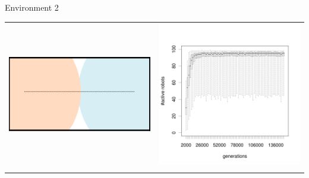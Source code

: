 \documentclass[8pt, handout=show,notes=show]{beamer}
\begin{document}
\begin{frame}{Environment 2}
 

\begin{table}[H]
\centering
\begin{tabular}{cc}
\includegraphics[width=\imgSize]{../images/5StaticEnv/environments/staticEnv2}&\includegraphics[width=\imgSize]{../images/5StaticEnv/alive_staticEnv2}\\
\newline

\end{tabular}
\end{table}
\end{frame}
\end{document}
